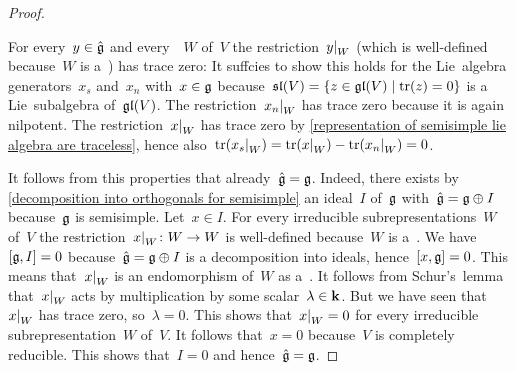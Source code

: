 \begin{proof}
\begin{itemize}
      For every~$y \in \hat{\mathfrak{g}}$ and every~{\subrepresentation{$\glie$}}~$W$ of~$V$ the restriction~$\restrict{y}{W}$ (which is well-defined because~$W$ is a~{\subrepresentation{$\hat{\glie}$}}) has trace zero:
      It suffcies to show this holds for the Lie~algebra generators~$x_s$ and~$x_n$ with~$x \in \mathfrak{g}$ because~$\sllie(V) = \{z \in \gllie(V) \suchthat \tr(z) = 0 \}$ is a Lie~subalgebra of~$\mathfrak{gl}(V)$.
      The restriction~$\restrict{x_n}{W}$ has trace zero because it is again nilpotent.
      The restriction~$\restrict{x}{W}$ has trace zero by \cref{representation of semisimple lie algebra are traceless}, hence also~$\tr(\restrict{x_s}{W}) = \tr(\restrict{x}{W}) - \tr(\restrict{x_n}{W}) = 0$.
  \end{itemize}
  
  It follows from this properties that already~$\hat{\mathfrak{g}} = \mathfrak{g}$.
  Indeed, there exists by \cref{decomposition into orthogonals for semisimple} an ideal~$I$ of~$\glie$ with~$\hat{\mathfrak{g}} = \mathfrak{g} \oplus I$ because~$\glie$ is semisimple.
  Let~$x \in I$.
  For every irreducible subrepresentations~$W$ of~$V$ the restriction~$\restrict{x}{W} \colon W \to W$ is well-defined because~$W$ is a~{\subrepresentation{$\hat{\glie}$}}.
  We have~$[\mathfrak{g}, I] = 0$ because~$\hat{\mathfrak{g}} = \mathfrak{g} \oplus I$ is a decomposition into ideals, hence~$[x, \mathfrak{g}] = 0$.
  This means that~$\restrict{x}{W}$ is an endomorphism of~$W$ as a~{\representation{$\glie$}}.
  It follows from Schur’s~lemma that~$\restrict{x}{W}$ acts by multiplication by some scalar~$\lambda \in \mathbf{k}$.
  But we have seen that~$\restrict{x}{W}$ has trace zero, so~$\lambda = 0$.
  This shows that~$\restrict{x}{W} = 0$ for every irreducible subrepresentation~$W$ of~$V$.
  It follows that~$x = 0$ because~$V$ is completely reducible.
  This shows that~$I = 0$ and hence~$\hat{\mathfrak{g}} = \mathfrak{g}$.
%  

\end{proof}
